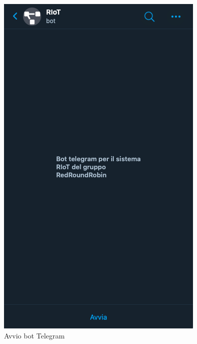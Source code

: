 		\begin{figure}[H]
		\centering
		\includegraphics[scale=0.600]{res/images/membro/avvioBot.png}
		\caption{Avvio bot Telegram}
	\end{figure}
